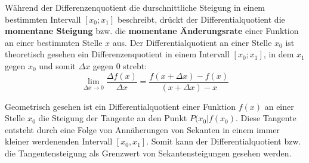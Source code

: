\begin{figure}[h!]
\centering
\end{figure}

\pagebreak


W\"{a}hrend der Differenzenquotient die durschnittliche Steigung in einem bestimmten Intervall $[x_{0};x_{1}]$ beschreibt, dr\"{u}ckt der Differentialquotient die \textbf{momentane Steigung} bzw. die \textbf{momentane \"{A}nderungsrate} einer Funktion an einer bestimmten Stelle $x$ aus. Der Differentialquotient an einer Stelle $x_{0}$ ist theoretisch gesehen ein Differenzenquotient in einem Intervall $[x_{0};x_{1}]$, in dem $x_{1}$ gegen $x_{0}$ und somit $\Delta x$ gegen $0$ strebt: $$\lim_{\Delta x\to0}\frac{\Delta f(x)}{\Delta x} = \frac{f(x + \Delta x) - f(x)}{(x + \Delta x) - x}$$

Geometrisch gesehen ist ein Differentialquotient einer Funktion $f(x)$ an einer Stelle $x_{0}$ die Steigung der Tangente an den Punkt $P(x_{0}|f(x_{0})$. Diese Tangente entsteht durch eine Folge von Ann\"{a}herungen von Sekanten in einem immer kleiner werdenenden Intervall $[x_{0}, x_{1}]$. Somit kann der Differentialquotient bzw. die Tangentensteigung als Grenzwert von Sekantensteigungen gesehen werden.


